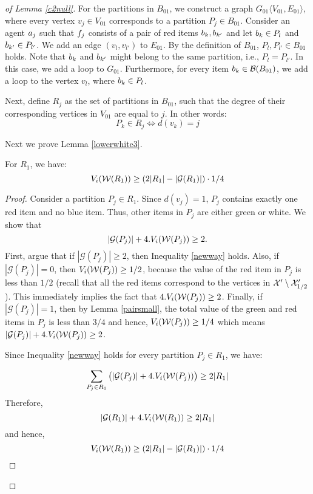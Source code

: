 \begin{proof}[of Lemma \ref{c2null}]
For the partitions in $B_{01}$, we construct a graph $G_{01} \langle V_{01},E_{01} \rangle$, where every vertex $v_j \in V_{01}$ corresponds to a partition $P_j \in B_{01}$. Consider an agent $a_j$ such that $f_j$ consists of a pair of red items $b_k,b_{k'}$ and let $b_k \in P_l$ and $b_{k'} \in P_{l'}$. We add an edge $(v_l,v_{l'})$ to $E_{01}$. By the definition of $B_{01}$, $P_l,P_{l'} \in B_{01}$ holds. Note that $b_k$ and $b_{k'}$ might belong to the same partition, i.e., $P_l = P_{l'}$. In this case, we add a loop to $G_{01}$. Furthermore, for every item $b_k \in {\mathcal B}(B_{01})$, we add a loop to the vertex $v_l$, where $b_k \in P_l$. 

Next, define $R_j$ as the set of partitions in $B_{01}$, such that the degree of their corresponding vertices in $V_{01}$ are equal to $j$. In other words:
$$P_k \in R_j \iff d(v_k)=j$$

Next we prove Lemma \ref{lowerwhite3}.

\begin{lemma}
\label{lowerwhite3}
For $R_1$, we have: $$V_i(\mathcal{W}(R_1)) \geq  (2|R_1| - |{\mathcal{G}}(R_1)|)\cdot 1/4 $$
\end{lemma}
\begin{proof}
Consider a partition $P_j \in R_1$. Since $d(v_j)=1$, $P_j$ contains exactly one red item and no blue item. Thus, other items in $P_j$ are either green or white. We show that 
\begin{equation}
\label{newway}
|{\mathcal G}(P_j)| + 4.V_i(\mathcal{W}(P_j)) \geq 2.
\end{equation}
First, argue that if $|{\mathcal G}(P_j)| \geq 2$, then Inequality \eqref{newway} holds. Also, if $|{\mathcal G}(P_j)|=0$, then $V_i(\mathcal{W}(P_j)) \geq 1/2$, because the value of the red item in $P_j$ is less than $1/2$ (recall that all the red items correspond to the vertices in $\mathcal{X}' \setminus \mathcal{X}'_{1/2}$). This immediately implies the fact that $4.V_i(\mathcal{W}(P_j)) \geq 2$. Finally, if $|{\mathcal G}(P_j)|=1$, then by Lemma \ref{pairsmall}, the total value of the green and red items in $P_j$ is less than $3/4$ and hence, $V_i(\mathcal{W}(P_j)) \geq 1/4$ which means $|{\mathcal G}(P_j)| + 4.V_i(\mathcal{W}(P_j)) \geq 2$.

Since Inequality \eqref{newway} holds for every partition $P_j \in R_1$, we have:

$$\sum_{P_j \in R_1} \big(|{\mathcal G}(P_j)| + 4.V_i(\mathcal{W}(P_j))\big) \geq 2 |R_1|$$
Therefore,
 $$|{\mathcal G}(R_1)| + 4.V_i(\mathcal{W}(R_1)) \geq 2|R_1|$$ and hence, $$V_i(\mathcal{W}(R_1)) \geq  (2|R_1| - |{\mathcal{G}}(R_1)|)\cdot 1/4 $$
\end{proof}


\end{proof}

